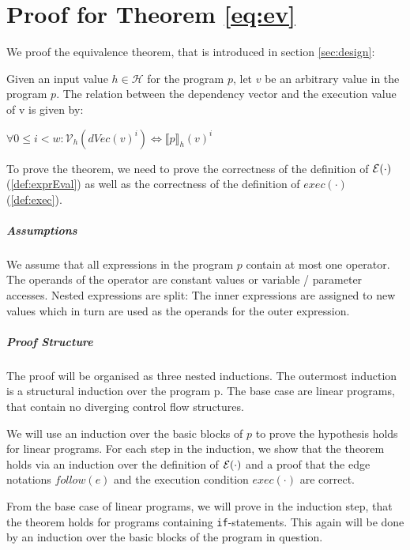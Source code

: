 \chapter{Proof for Theorem \ref{eq:ev}}\label{ch:evProof}

We proof the equivalence theorem, that is introduced in section \ref{sec:design}:

\begin{theorem*}
    Given an input value $h \in \mathcal{H}$ for the program $p$, let $v$ be an arbitrary value in the program $p$. The relation between the dependency vector and the execution value of v is given by:
    \begin{center}
        $\forall 0 \leq i < w: \mathcal{V}_h(dVec(v)^i) \iff \llbracket p \rrbracket_h (v)^i$
    \end{center}
\end{theorem*}

To prove the theorem, we need to prove the correctness of the definition of $\mathcal{E}(\cdot)$ (\ref{def:exprEval}) as well as the correctness of the definition of $exec(\cdot)$ (\ref{def:exec}).

\paragraph{Assumptions}
We assume that all expressions in the program $p$ contain at most one operator. The operands of the operator are constant values or variable / parameter accesses. Nested expressions are split: The inner expressions are assigned to new values which in turn are used as the operands for the outer expression.

\paragraph{Proof Structure}
The proof will be organised as three nested inductions. The outermost induction is a structural induction over the program p. The base case are linear programs, that contain no diverging control flow structures.

We will use an induction over the basic blocks of $p$ to prove the hypothesis holds for linear programs. For each step in the induction, we show that the theorem holds via an induction over the definition of $\mathcal{E}(\cdot)$ and a proof that the edge notations $follow(e)$ and the execution condition $exec(\cdot)$ are correct.

From the base case of linear programs, we will prove in the induction step, that the theorem holds for programs containing \texttt{if}-statements. This again will be done by an induction over the basic blocks of the program in question.

